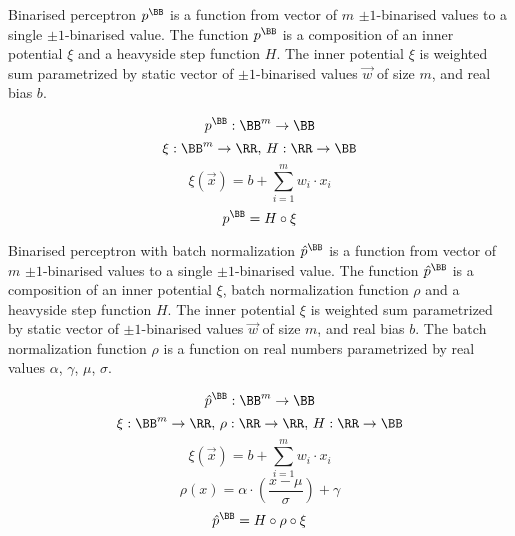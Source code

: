 \begin{definition}\label{def:binarised_perceptron}
Binarised perceptron $p^\BB$ is a function from vector of $m$ $\pm 1$-binarised values
to a single $\pm 1$-binarised value.
The function $p^\BB$ is a composition of an inner potential $\xi$
and a heavyside step function $H$. The inner potential $\xi$ is weighted sum
parametrized by static vector of $\pm 1$-binarised values
$\vec w$ of size $m$, and real bias $b$.

\begin{equation*}
	p^\BB: \BB^m \to \BB
\end{equation*}
\begin{equation*}
	\xi: \BB^m \to \RR, \,
	H: \RR \to \BB
\end{equation*}
\begin{equation*}
	\xi(\vec x) = b + \sum_{i=1}^m w_i\cdot x_i
\end{equation*}
\begin{equation*}
	p^\BB = H \circ \xi
\end{equation*}
\end{definition}

\begin{definition}\label{def:perceptron_bn}
Binarised perceptron with batch normalization $\hat{p}^\BB$
is a function from vector of $m$ $\pm 1$-binarised values
to a single $\pm 1$-binarised value.
The function $\hat p^\BB$ is a composition of an inner potential $\xi$,
batch normalization function $\rho$ and a heavyside step function $H$.
The inner potential $\xi$ is weighted sum parametrized by static vector
of $\pm 1$-binarised values $\vec w$ of size $m$, and real bias $b$.
The batch normalization function $\rho$ is a function on real numbers
parametrized by real values $\alpha$, $\gamma$, $\mu$, $\sigma$.

\begin{equation*}
	\hat{p}^\BB: \BB^m \to \BB
\end{equation*}
\begin{equation*}
	\xi: \BB^m \to \RR, \,
	\rho: \RR \to \RR, \,
	H: \RR \to \BB
\end{equation*}
\begin{equation*}
	\xi(\vec x) = b + \sum_{i=1}^m w_i\cdot x_i
\end{equation*}
\begin{equation*}
	\rho(x) = \alpha\cdot \left(\frac{x-\mu}{\sigma}\right) + \gamma
\end{equation*}
\begin{equation*}
	\hat{p}^\BB = H \circ \rho \circ \xi
\end{equation*}
\end{definition}

